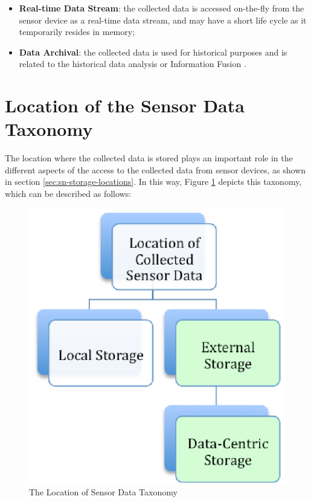 \begin{itemize}
  \item \textbf{Real-time Data Stream}: the collected data is accessed
  on-the-fly from the sensor device as a real-time data stream, and may have a
  short life cycle as it temporarily resides in memory;
  \item \textbf{Data Archival}: the collected data is used for historical
  purposes and is related to the historical data analysis \cite{sn-intro01,
  sn-intro02} or Information Fusion \cite{sn-info-fusion}. 
\end{itemize}

\section{Location of the Sensor Data Taxonomy}

The location where the collected data is stored plays an important role
in the different aspects of the access to the collected data from sensor
devices, as shown in section \ref{sec:sn-storage-locations}. In this way,
Figure \ref{fig:taxonomy-data-location} depicts this taxonomy, which can be
described as follows:

\begin{figure}[h]
  \centering
  \includegraphics{../diagrams/taxonomy-data-location}
  \caption{The Location of Sensor Data Taxonomy}
  \label{fig:taxonomy-data-location}
\end{figure}

